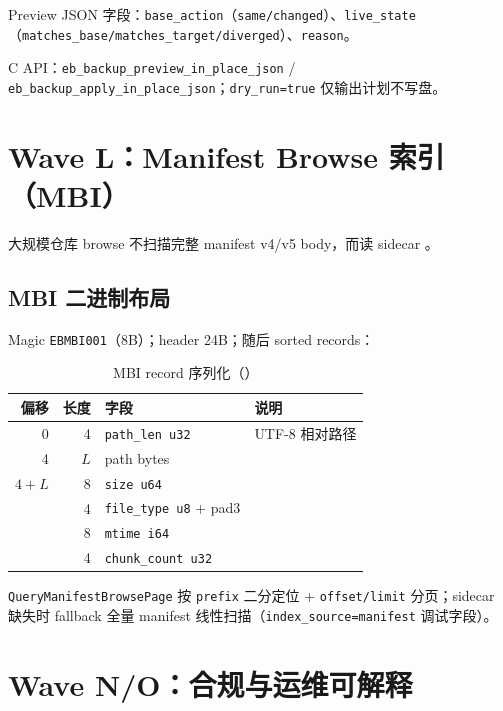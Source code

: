Preview JSON 字段：\texttt{base\_action}（\texttt{same/changed}）、\texttt{live\_state}（\texttt{matches\_base/matches\_target/diverged}）、\texttt{reason}。

C API：\texttt{eb\_backup\_preview\_in\_place\_json} / \texttt{eb\_backup\_apply\_in\_place\_json}；\texttt{dry\_run=true} 仅输出计划不写盘。

\section{Wave L：Manifest Browse 索引（MBI）}
\label{sec:cap-mbi}

大规模仓库 browse 不扫描完整 manifest v4/v5 body，而读 sidecar 。

\subsection{MBI 二进制布局}

Magic \texttt{EBMBI001}（8B）；header 24B；随后 sorted records：

\begin{longtable}{@{}rrll@{}}
\caption{MBI record 序列化（）} \\
\toprule
偏移 & 长度 & 字段 & 说明 \\
\midrule
0 & 4 & \texttt{path\_len u32} & UTF-8 相对路径 \\
4 & $L$ & path bytes & \\
$4+L$ & 8 & \texttt{size u64} & \\
 & 4 & \texttt{file\_type u8} + pad3 & \\
 & 8 & \texttt{mtime i64} & \\
 & 4 & \texttt{chunk\_count u32} & \\
\bottomrule
\end{longtable}

\texttt{QueryManifestBrowsePage} 按 \texttt{prefix} 二分定位 + \texttt{offset/limit} 分页；sidecar 缺失时 fallback 全量 manifest 线性扫描（\texttt{index\_source=manifest} 调试字段）。

\section{Wave N/O：合规与运维可解释}
\label{sec:cap-ops}

